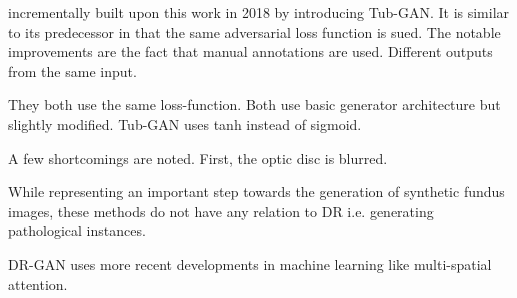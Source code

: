 \citeauthor{ZHAO201814} incrementally built upon this work in 2018 by introducing Tub-GAN. It is similar to its predecessor in that the same adversarial loss function is sued. The notable improvements are the fact that manual annotations are used. Different outputs from the same input. 

They both use the same loss-function. Both use basic generator architecture but slightly modified. Tub-GAN uses tanh instead of sigmoid.

A few shortcomings are noted. First, the optic disc is blurred.

While representing an important step towards the generation of synthetic fundus images, these methods do not have any relation to DR i.e. generating pathological instances.

DR-GAN uses more recent developments in machine learning like multi-spatial attention.